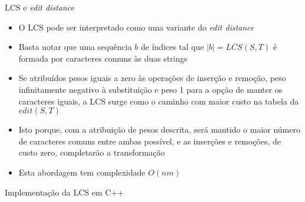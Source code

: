 \begin{frame}[fragile]{LCS e {\it edit distance}}

    \begin{itemize}
        \item O LCS pode ser interpretado como uma variante do \textit{edit distance}

        \item Basta notar que uma sequência $b$ de índices tal que $|b| = LCS(S, T)$ é
            formada por caracteres comuns às duas strings

        \item Se atribuídos pesos iguais a zero às operações de inserção e remoção, peso 
            infinitamente negativo à substituição e peso 1 para a opção de manter os caracteres iguais, 
            a LCS surge como o caminho com maior custo na tabela da $edit(S, T)$

        \item Isto porque, com a atribuição de pesos descrita, será mantido o maior número de
            caracteres comuns entre ambas possível, e as inserções e remoções, de custo zero,
            completarão a transformação

        \item Esta abordagem tem complexidade $O(nm)$
    \end{itemize}

\end{frame}



\begin{frame}[fragile]{Implementação da LCS em C++}
\end{frame}
